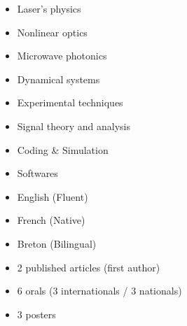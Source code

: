 

\vspace{-0.1em}



\begin{itemize}
	\item {Laser's physics}
	\item {Nonlinear optics}
	\item {Microwave photonics}
	\item {Dynamical systems}
	\item {Experimental techniques}
	\item {Signal theory and analysis}
\end{itemize}

\divider


\begin{itemize}
\item Coding \& Simulation

\smallskip
{}	

\medskip

\item Softwares

\smallskip
{}
\end{itemize}

\divider


\begin{itemize}

\item English (Fluent)
\item French (Native)
\item Breton (Bilingual)

\end{itemize}

\medskip
{}

\begin{itemize}
	\item 2 published articles (first author)
\end{itemize}

\begin{itemize}
	\item 6 orals (3 internationals / 3 nationals)
	\item 3 posters
\end{itemize}

